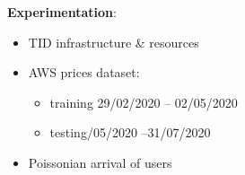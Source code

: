 \documentclass[aspectratio=169]{beamer}
\begin{document}
\begin{frame}
    \frametitle{\secname}
    \framesubtitle{\subsecname}

    \textbf{Experimentation}:
    \begin{itemize}
        \item TID infrastructure \& resources~\cite{tid}\pause
        \item AWS prices dataset:
            \begin{itemize}
                \item training 29/02/2020 -- 02/05/2020
                \item testing/05/2020 --31/07/2020
            \end{itemize}\pause
        \item Poissonian arrival of users
    \end{itemize}
\end{frame}
\end{document}
